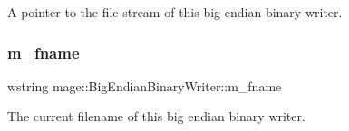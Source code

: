 A pointer to the file stream of this big endian binary writer. \hypertarget{classmage_1_1_big_endian_binary_writer_a5bf83b685bfce080f55458bdca2e698a}{}\label{classmage_1_1_big_endian_binary_writer_a5bf83b685bfce080f55458bdca2e698a} 
\subsubsection{\texorpdfstring{m\+\_\+fname}{m\_fname}}
{\footnotesize\ttfamily wstring mage\+::\+Big\+Endian\+Binary\+Writer\+::m\+\_\+fname\hspace{0.3cm}{\ttfamily [private]}}

The current filename of this big endian binary writer. 